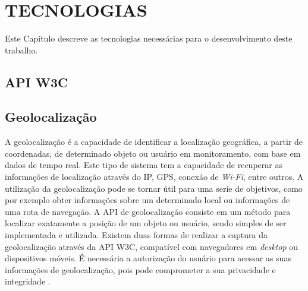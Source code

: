 
\chapter{TECNOLOGIAS}

Este Capítulo descreve as tecnologias necessárias para o desenvolvimento deste trabalho.

\section{API W3C}

\section{Geolocalização}


A geolocalização é a capacidade de identificar a localização geográfica, a partir de coordenadas, de determinado objeto ou usuário em monitoramento, com base em dados de tempo real. Este tipo de sistema tem a capacidade de recuperar as informações de localização através do IP, GPS, conexão de \textit{Wi-Fi}, entre outros. A utilização da geolocalização pode se tornar útil para uma serie de objetivos, como por exemplo obter informações sobre um determinado local ou informações de uma rota de navegação. A API de geolocalização consiste em um método para localizar exatamente a posição de um objeto ou usuário, sendo simples de ser implementada e utilizada. Existem duas formas de realizar a captura da geolocalização através da API W3C, compatível com navegadores em \textit{desktop} ou dispositivos móveis. É necessária a autorização do usuário para acessar as suas informações de geolocalização, pois pode comprometer a sua privacidade e integridade \cite{geolocalizacao:2011}.


